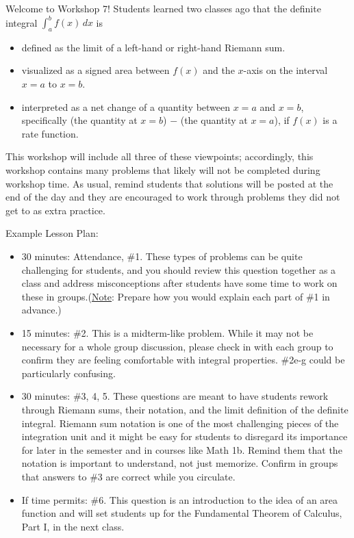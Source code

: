 \documentclass{article}
\begin{document}


\begin{workshop}
Welcome to Workshop 7! 
\newline 
  Students learned two classes ago that the definite integral $\displaystyle
  \int_a^b f(x)\,dx$ is
  \begin{itemize}[nosep]
  \item defined as the limit of a left-hand or right-hand Riemann sum.
  \item visualized as a signed area between $f(x)$ and the $x$-axis on the interval $x=a$ to $x=b$.
  \item interpreted as a net change of a quantity between $x=a$ and $x=b$, \newline specifically (the quantity at $x=b$) $-$ (the quantity at $x=a$), if $f(x)$ is a rate function.    
  \end{itemize}

  This workshop will include all three of these viewpoints; accordingly, this workshop contains many problems that likely will not be completed during workshop time. As usual, remind students that solutions will be posted at the end of the day and they are encouraged to work through problems they did not get to as extra practice.

  Example Lesson Plan:
  \begin{itemize}
      \item 30 minutes: Attendance, \#1. These types of problems can be quite challenging for students, and you should review this question together as a class and address misconceptions after students have some time to work on these in groups.(\underline{Note}: Prepare how you would explain each part of \#1 in advance.)
      \item 15 minutes: \#2. This is a midterm-like problem. While it may not be necessary for a whole group discussion, please check in with each group to confirm they are feeling comfortable with integral properties. \#2e-g could be particularly confusing.
      \item 30 minutes: \#3, 4, 5. These questions are meant to have students rework through Riemann sums, their notation, and the limit definition of the definite integral. Riemann sum notation is one of the most challenging pieces of the integration unit and it might be easy for students to disregard its importance for later in the semester and in courses like Math 1b. Remind them that the notation is important to understand, not just memorize. Confirm in groups that answers to \#3 are correct while you circulate.
      \item If time permits: \#6. This question is an introduction to the idea of an area function and will set students up for the Fundamental Theorem of Calculus, Part I, in the next class. 
  \end{itemize}
   
\end{workshop}
\end{document}
